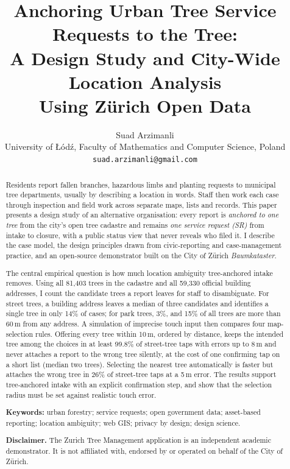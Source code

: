 \documentclass[11pt,a4paper]{article}
\title{Anchoring Urban Tree Service Requests to the Tree:\\
       A Design Study and City-Wide Location Analysis\\ Using Zürich Open Data}
\author{Suad Arzimanli\\[2pt]
        \small University of \L{}ód\'{z}, Faculty of Mathematics and Computer Science, Poland\\
        \small \texttt{suad.arzimanli@gmail.com}}
\date{}
\newcommand{\appname}{Zurich Tree Management}
\begin{document}
\maketitle

\begin{abstract}
Residents report fallen branches, hazardous limbs and planting requests to municipal tree departments, usually by describing a location in words. Staff then work each case through inspection and field work across separate maps, lists and records. This paper presents a design study of an alternative organisation: every report is \emph{anchored to one tree} from the city's open tree cadastre and remains \emph{one service request (SR)} from intake to closure, with a public status view that never reveals who filed it. I describe the case model, the design principles drawn from civic-reporting and case-management practice, and an open-source demonstrator built on the City of Zürich \emph{Baumkataster}.

The central empirical question is how much location ambiguity tree-anchored intake removes. Using all 81{,}403 trees in the cadastre and all 59{,}330 official building addresses, I count the candidate trees a report leaves for staff to disambiguate. For street trees, a building address leaves a median of three candidates and identifies a single tree in only 14\% of cases; for park trees, 3\%, and 15\% of all trees are more than 60\,m from any address. A simulation of imprecise touch input then compares four map-selection rules. Offering every tree within 10\,m, ordered by distance, keeps the intended tree among the choices in at least 99.8\% of street-tree taps with errors up to 8\,m and never attaches a report to the wrong tree silently, at the cost of one confirming tap on a short list (median two trees). Selecting the nearest tree automatically is faster but attaches the wrong tree in 26\% of street-tree taps at a 5\,m error. The results support tree-anchored intake with an explicit confirmation step, and show that the selection radius must be set against realistic touch error.

\medskip
\noindent\textbf{Keywords:} urban forestry; service requests; open government data; asset-based reporting; location ambiguity; web GIS; privacy by design; design science.

\smallskip
\noindent\textbf{Disclaimer.} The \appname{} application is an independent academic demonstrator. It is not affiliated with, endorsed by or operated on behalf of the City of Zürich.
\end{abstract}
\end{document}
